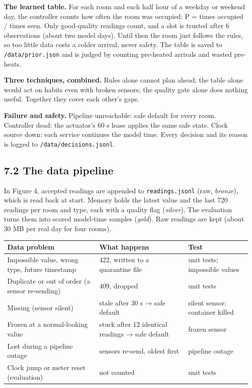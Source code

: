\documentclass[11pt]{article}
\begin{document}
\textbf{The learned table.} For each room and each half hour of a weekday or weekend day, the
controller counts how often the room was occupied: P = times occupied / times seen. Only
good-quality readings count, and a slot is trusted after 6 observations (about two model days).
Until then the room just follows the rules, so too little data costs a colder arrival, never
safety. The table is saved to \texttt{/data/prior.json} and is judged by counting pre-heated
arrivals and wasted pre-heats.

\textbf{Three techniques, combined.} Rules alone cannot plan ahead; the table alone would act on
habits even with broken sensors; the quality gate alone does nothing useful. Together they cover
each other's gaps.

\textbf{Failure and safety.} Pipeline unreachable: safe default for every room. Controller dead:
the actuator's 60 s lease applies the same safe state. Clock source down: each service continues
the model time. Every decision and its reason is logged to \texttt{/data/decisions.jsonl}.

\subsection{7.2 The data pipeline}


In Figure 4, accepted readings are appended to \texttt{readings.jsonl} (raw, \emph{bronze}), which is read back
at start. Memory holds the latest value and the last 720 readings per room and type, each with a
quality flag (\emph{silver}). The evaluation turns them into scored model-time samples
(\emph{gold}). Raw readings are kept (about 30 MB per real day for four rooms).

\begin{longtable}{@{}L{0.3}L{0.42}L{0.28}@{}}
\toprule
\textbf{Data problem} & \textbf{What happens} & \textbf{Test} \\
\midrule
\endhead
\bottomrule
\endlastfoot
Impossible value, wrong type, future timestamp & 422, written to a quarantine file & unit tests; impossible values \\
Duplicate or out of order (a sensor re-sending) & 409, dropped & unit tests \\
Missing (sensor silent) & stale after 30 s → safe default & silent sensor; container killed \\
Frozen at a normal-looking value & stuck after 12 identical readings → safe default & frozen sensor \\
Lost during a pipeline outage & sensors re-send, oldest first & pipeline outage \\
Clock jump or meter reset (evaluation) & not counted & unit tests \\
\end{longtable}
\end{document}
